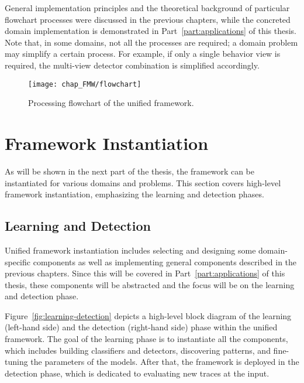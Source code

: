 General implementation principles and the theoretical background of particular flowchart processes were discussed in the previous chapters, while the concreted domain implementation is demonstrated in Part~\ref{part:applications} of this thesis. Note that, in some domains, not all the processes are required; a domain problem may simplify a certain process. For example, if only a single behavior view is required, the multi-view detector combination is simplified accordingly.

\begin{figure}[!h]
\centering
\texttt{[image: chap\_FMW/flowchart]}
\caption{Processing flowchart of the unified framework.}
\label{fig:flowchart}
\end{figure}



\section{Framework Instantiation}
As will be shown in the next part of the thesis, the framework can be instantiated for various domains and problems. 
This section covers high-level framework instantiation, emphasizing the learning and detection phases. 

\subsection{Learning and Detection}
Unified framework instantiation includes selecting and designing some
domain-specific components as well as implementing general components described in the previous chapters. Since this will be covered in Part~\ref{part:applications} of this thesis, these components will be abstracted and the focus will be on the learning and detection phase.

Figure~\ref{fig:learning-detection} depicts a high-level block diagram of the learning (left-hand side) and the detection (right-hand side) phase within the unified framework. The goal of the learning phase is to instantiate all the components, which includes building classifiers and detectors, discovering patterns, and fine-tuning the parameters of the models. After that, the framework is deployed in the detection phase, which is dedicated to evaluating new traces at the input.

